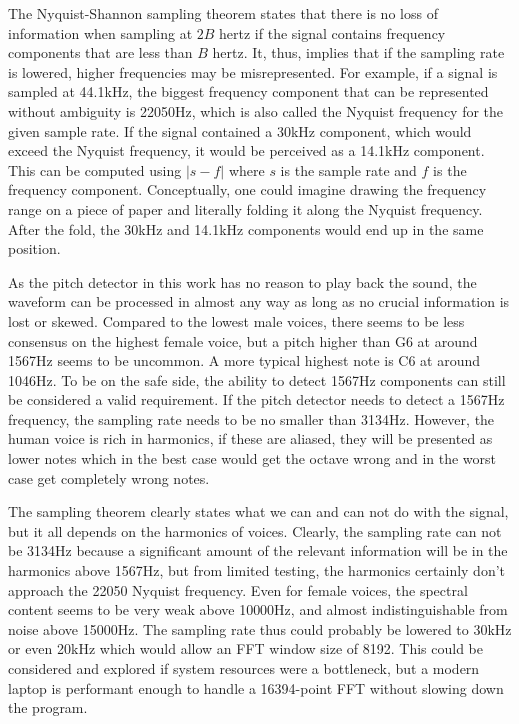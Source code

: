 The Nyquist-Shannon sampling theorem states that there is no loss of information when sampling at $2B$ hertz if the signal contains frequency components that are less than $B$ hertz. It, thus, implies that if the sampling rate is lowered, higher frequencies may be misrepresented. For example, if a signal is sampled at 44.1kHz, the biggest frequency component that can be represented without ambiguity is 22050Hz, which is also called the Nyquist frequency for the given sample rate. If the signal contained a 30kHz component, which would exceed the Nyquist frequency, it would be perceived as a 14.1kHz component. This can be computed using $|s-f|$ where $s$ is the sample rate and $f$ is the frequency component. Conceptually, one could imagine drawing the frequency range on a piece of paper and literally folding it along the Nyquist frequency. After the fold, the 30kHz and 14.1kHz components would end up in the same position.

As the pitch detector in this work has no reason to play back the sound, the waveform can be processed in almost any way as long as no crucial information is lost or skewed. Compared to the lowest male voices, there seems to be less consensus on the highest female voice, but a pitch higher than G6 at around 1567Hz seems to be uncommon. A more typical highest note is C6 at around 1046Hz. To be on the safe side, the ability to detect 1567Hz components can still be considered a valid requirement. If the pitch detector needs to detect a 1567Hz frequency, the sampling rate needs to be no smaller than 3134Hz. However, the human voice is rich in harmonics, if these are aliased, they will be presented as lower notes which in the best case would get the octave wrong and in the worst case get completely wrong notes.

The sampling theorem clearly states what we can and can not do with the signal, but it all depends on the harmonics of voices. Clearly, the sampling rate can not be 3134Hz because a significant amount of the relevant information will be in the harmonics above 1567Hz, but from limited testing, the harmonics certainly don't approach the 22050 Nyquist frequency. Even for female voices, the spectral content seems to be very weak above 10000Hz, and almost indistinguishable from noise above 15000Hz. The sampling rate thus could probably be lowered to 30kHz or even 20kHz which would allow an FFT window size of 8192. This could be considered and explored if system resources were a bottleneck, but a modern laptop is performant enough to handle a 16394-point FFT without slowing down the program.

